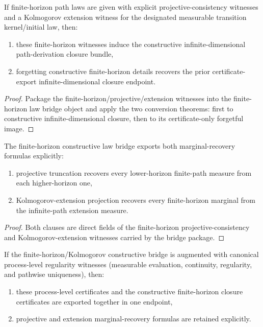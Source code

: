 \begin{theorem}\label{thm:langevin-finite-horizon-law-derivation-bridge}
If finite-horizon path laws are given with explicit projective-consistency witnesses and a Kolmogorov extension witness for the designated measurable transition kernel/initial law, then:
\begin{enumerate}
\item these finite-horizon witnesses induce the constructive infinite-dimensional path-derivation closure bundle,
\item forgetting constructive finite-horizon details recovers the prior certificate-export infinite-dimensional closure endpoint.
\end{enumerate}
\end{theorem}

\begin{proof}
Package the finite-horizon/projective/extension witnesses into the finite-horizon law bridge object and apply the two conversion theorems: first to constructive infinite-dimensional closure, then to its certificate-only forgetful image.
\end{proof}

\begin{theorem}\label{thm:langevin-finite-horizon-marginal-recovery}
The finite-horizon constructive law bridge exports both marginal-recovery formulas explicitly:
\begin{enumerate}
\item projective truncation recovers every lower-horizon finite-path measure from each higher-horizon one,
\item Kolmogorov-extension projection recovers every finite-horizon marginal from the infinite-path extension measure.
\end{enumerate}
\end{theorem}

\begin{proof}
Both clauses are direct fields of the finite-horizon projective-consistency and Kolmogorov-extension witnesses carried by the bridge package.
\end{proof}

\begin{theorem}\label{thm:langevin-canonical-continuous-path-process-closure}
If the finite-horizon/Kolmogorov constructive bridge is augmented with canonical process-level regularity witnesses (measurable evaluation, continuity, regularity, and pathwise uniqueness), then:
\begin{enumerate}
\item these process-level certificates and the constructive finite-horizon closure certificates are exported together in one endpoint,
\item projective and extension marginal-recovery formulas are retained explicitly.
\end{enumerate}
\end{theorem}

